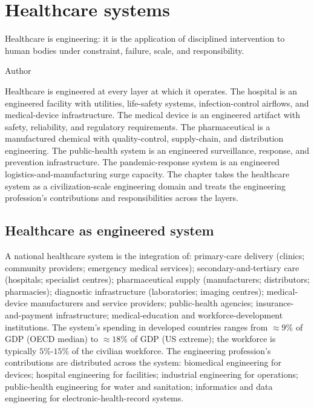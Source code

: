 \chapter{Healthcare systems}
\label{vol12:ch06}

\epigraph{Healthcare is engineering: it is the application of disciplined intervention to human bodies under constraint, failure, scale, and responsibility.}{Author}


\noindent
Healthcare is engineered at every layer at which it operates. The hospital is an engineered facility with utilities, life-safety systems, infection-control airflows, and medical-device infrastructure. The medical device is an engineered artifact with safety, reliability, and regulatory requirements. The pharmaceutical is a manufactured chemical with quality-control, supply-chain, and distribution engineering. The public-health system is an engineered surveillance, response, and prevention infrastructure. The pandemic-response system is an engineered logistics-and-manufacturing surge capacity. The chapter takes the healthcare system as a civilization-scale engineering domain and treats the engineering profession's contributions and responsibilities across the layers.

\section{Healthcare as engineered system}

A national healthcare system is the integration of: primary-care delivery (clinics; community providers; emergency medical services); secondary-and-tertiary care (hospitals; specialist centres); pharmaceutical supply (manufacturers; distributors; pharmacies); diagnostic infrastructure (laboratories; imaging centres); medical-device manufacturers and service providers; public-health agencies; insurance-and-payment infrastructure; medical-education and workforce-development institutions. The system's spending in developed countries ranges from $\approx 9\%$ of GDP (OECD median) to $\approx 18\%$ of GDP (US extreme); the workforce is typically $5\%$-$15\%$ of the civilian workforce. The engineering profession's contributions are distributed across the system: biomedical engineering for devices; hospital engineering for facilities; industrial engineering for operations; public-health engineering for water and sanitation; informatics and data engineering for electronic-health-record systems.

